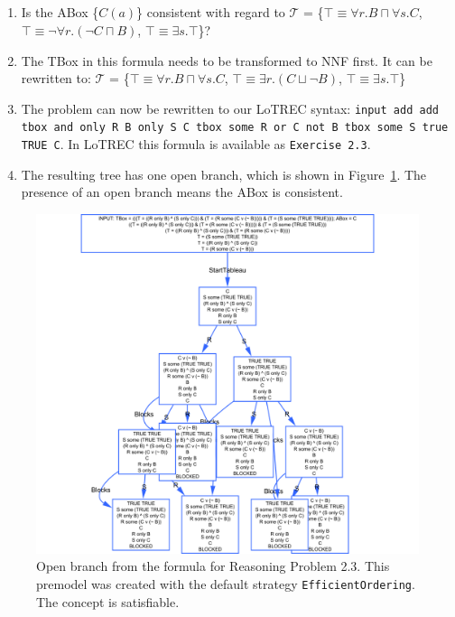 \documentclass[11pt]{article} %
\begin{document}
\subsection{}

\begin{enumerate}

\item Is the ABox \{$C(a)$\} consistent with regard to $\mathcal{T}$ = \{$\top \equiv \forall r.B \sqcap \forall s.C$, $\top \equiv \neg \forall r.(\neg C \sqcap B)$, $\top \equiv \exists s.\top$\}?

\item The TBox in this formula needs to be transformed to NNF first. It can be rewritten to: $\mathcal{T}$ = \{$\top \equiv \forall r.B \sqcap \forall s.C$, $\top \equiv \exists r.(C \sqcup \neg B)$, $\top \equiv \exists s.\top$\}

\item The problem can now be rewritten to our LoTREC syntax: \texttt{input add add tbox and only R B only S C tbox some R or C not B tbox some S true TRUE C}. In LoTREC this formula is available as \texttt{Exercise 2.3}.

\item The resulting tree has one open branch, which is shown in Figure~\ref{fig:23Open}. The presence of an open branch means the ABox is consistent.

\end{enumerate}

\begin{figure}
\begin{center}
\includegraphics[scale=0.4]{premodel23Open.png}
\caption{Open branch from the formula for Reasoning Problem 2.3. This premodel was created with the default strategy \texttt{EfficientOrdering}. The concept is satisfiable.}
\label{fig:23Open}
\end{center}
\end{figure}
\end{document}
